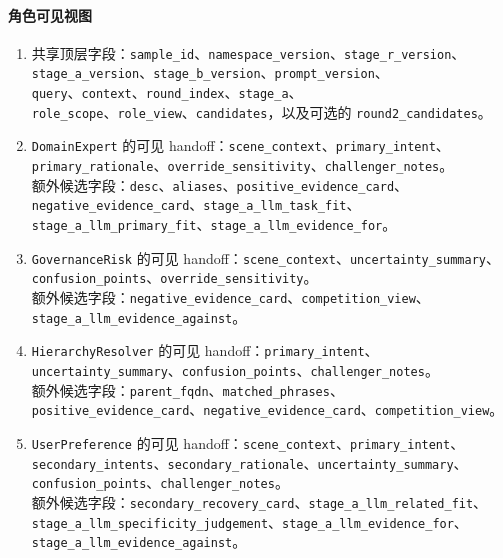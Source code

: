 \documentclass[11pt,a4paper]{ctexart}
\begin{document}
\paragraph{角色可见视图}
\begin{enumerate}[leftmargin=1.6em]
\item 共享顶层字段：\texttt{sample\_id}、\texttt{namespace\_version}、\texttt{stage\_r\_version}、\\
\texttt{stage\_a\_version}、\texttt{stage\_b\_version}、\texttt{prompt\_version}、\\
\texttt{query}、\texttt{context}、\texttt{round\_index}、\texttt{stage\_a}、\\
\texttt{role\_scope}、\texttt{role\_view}、\texttt{candidates}，以及可选的 \texttt{round2\_candidates}。
\item \texttt{DomainExpert} 的可见 handoff：\texttt{scene\_context}、\texttt{primary\_intent}、\\
\texttt{primary\_rationale}、\texttt{override\_sensitivity}、\texttt{challenger\_notes}。\\
额外候选字段：\texttt{desc}、\texttt{aliases}、\texttt{positive\_evidence\_card}、\\
\texttt{negative\_evidence\_card}、\texttt{stage\_a\_llm\_task\_fit}、\\
\texttt{stage\_a\_llm\_primary\_fit}、\texttt{stage\_a\_llm\_evidence\_for}。
\item \texttt{GovernanceRisk} 的可见 handoff：\texttt{scene\_context}、\texttt{uncertainty\_summary}、\\
\texttt{confusion\_points}、\texttt{override\_sensitivity}。\\
额外候选字段：\texttt{negative\_evidence\_card}、\texttt{competition\_view}、\\
\texttt{stage\_a\_llm\_evidence\_against}。
\item \texttt{HierarchyResolver} 的可见 handoff：\texttt{primary\_intent}、\\
\texttt{uncertainty\_summary}、\texttt{confusion\_points}、\texttt{challenger\_notes}。\\
额外候选字段：\texttt{parent\_fqdn}、\texttt{matched\_phrases}、\\
\texttt{positive\_evidence\_card}、\texttt{negative\_evidence\_card}、\texttt{competition\_view}。
\item \texttt{UserPreference} 的可见 handoff：\texttt{scene\_context}、\texttt{primary\_intent}、\\
\texttt{secondary\_intents}、\texttt{secondary\_rationale}、\texttt{uncertainty\_summary}、\\
\texttt{confusion\_points}、\texttt{challenger\_notes}。\\
额外候选字段：\texttt{secondary\_recovery\_card}、\texttt{stage\_a\_llm\_related\_fit}、\\
\texttt{stage\_a\_llm\_specificity\_judgement}、\texttt{stage\_a\_llm\_evidence\_for}、\\
\texttt{stage\_a\_llm\_evidence\_against}。
\end{enumerate}
\end{document}
